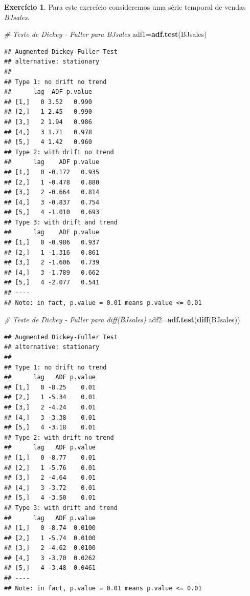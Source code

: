 \documentclass[
]{book}
\newenvironment{Shaded}{\begin{snugshade}}{\end{snugshade}}
\newcommand{\CommentTok}[1]{\textcolor[rgb]{0.56,0.35,0.01}{\textit{#1}}}
\newcommand{\KeywordTok}[1]{\textcolor[rgb]{0.13,0.29,0.53}{\textbf{#1}}}
\newcommand{\NormalTok}[1]{#1}
\theoremstyle{definition}
\theoremstyle{definition}
\theoremstyle{definition}
\newtheorem{exercise}{Exercício}[chapter]
\theoremstyle{remark}
\begin{document}
\begin{exercise}
\protect\hypertarget{exr:exns4}{}{\label{exr:exns4} }Para este exercício consideremos uma série temporal de vendas \emph{BJsales}.
\end{exercise}

\begin{Shaded}
\begin{Highlighting}[]
\CommentTok{# Teste de Dickey - Fuller para BJsales}
\NormalTok{adf1=}\KeywordTok{adf.test}\NormalTok{(BJsales)}
\end{Highlighting}
\end{Shaded}

\begin{verbatim}
## Augmented Dickey-Fuller Test 
## alternative: stationary 
##  
## Type 1: no drift no trend 
##      lag  ADF p.value
## [1,]   0 3.52   0.990
## [2,]   1 2.45   0.990
## [3,]   2 1.94   0.986
## [4,]   3 1.71   0.978
## [5,]   4 1.42   0.960
## Type 2: with drift no trend 
##      lag    ADF p.value
## [1,]   0 -0.172   0.935
## [2,]   1 -0.478   0.880
## [3,]   2 -0.664   0.814
## [4,]   3 -0.837   0.754
## [5,]   4 -1.010   0.693
## Type 3: with drift and trend 
##      lag    ADF p.value
## [1,]   0 -0.986   0.937
## [2,]   1 -1.316   0.861
## [3,]   2 -1.606   0.739
## [4,]   3 -1.789   0.662
## [5,]   4 -2.077   0.541
## ---- 
## Note: in fact, p.value = 0.01 means p.value <= 0.01
\end{verbatim}

\begin{Shaded}
\begin{Highlighting}[]
\CommentTok{# Teste de Dickey - Fuller para diff(BJsales)}
\NormalTok{adf2=}\KeywordTok{adf.test}\NormalTok{(}\KeywordTok{diff}\NormalTok{(BJsales))}
\end{Highlighting}
\end{Shaded}

\begin{verbatim}
## Augmented Dickey-Fuller Test 
## alternative: stationary 
##  
## Type 1: no drift no trend 
##      lag   ADF p.value
## [1,]   0 -8.25    0.01
## [2,]   1 -5.34    0.01
## [3,]   2 -4.24    0.01
## [4,]   3 -3.38    0.01
## [5,]   4 -3.18    0.01
## Type 2: with drift no trend 
##      lag   ADF p.value
## [1,]   0 -8.77    0.01
## [2,]   1 -5.76    0.01
## [3,]   2 -4.64    0.01
## [4,]   3 -3.72    0.01
## [5,]   4 -3.50    0.01
## Type 3: with drift and trend 
##      lag   ADF p.value
## [1,]   0 -8.74  0.0100
## [2,]   1 -5.74  0.0100
## [3,]   2 -4.62  0.0100
## [4,]   3 -3.70  0.0262
## [5,]   4 -3.48  0.0461
## ---- 
## Note: in fact, p.value = 0.01 means p.value <= 0.01
\end{verbatim}
\end{document}
